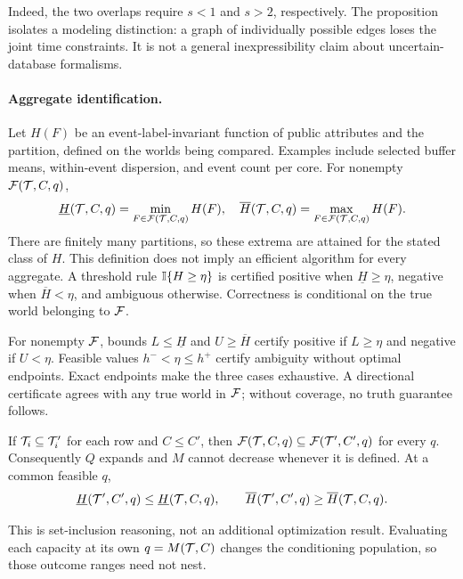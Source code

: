 Indeed, the two overlaps require $s<1$ and $s>2$, respectively.
The proposition isolates a modeling distinction: a graph of individually
possible edges loses the joint time constraints. It is not a general
inexpressibility claim about uncertain-database formalisms.

\paragraph{Aggregate identification.}
Let $H(F)$ be an event-label-invariant function of public attributes and the
partition, defined on the worlds being compared. Examples include selected
buffer means, within-event dispersion, and event count per core.
For nonempty $\mathcal F(\mathcal T,C,q)$,
\begin{equation}
 \underline H(\mathcal T,C,q)=\min_{F\in\mathcal F(\mathcal T,C,q)}H(F),\quad
 \overline H(\mathcal T,C,q)=\max_{F\in\mathcal F(\mathcal T,C,q)}H(F).
 \label{eq:endpoints}
\end{equation}
There are finitely many partitions, so these extrema are attained for the
stated class of $H$. This definition does not imply an efficient algorithm
for every aggregate. A threshold rule $\mathbb I\{H\ge\eta\}$ is certified positive
when $\underline H\ge\eta$, negative when $\overline H<\eta$, and ambiguous
otherwise. Correctness is conditional on the true world belonging to $\mathcal F$.

\begin{theorem}
\label{thm:decisioncertification}
For nonempty $\mathcal F$, bounds $L\le\underline H$ and $U\ge\overline H$ certify
positive if $L\ge\eta$ and negative if $U<\eta$. Feasible values
$h^-<\eta\le h^+$ certify ambiguity without optimal endpoints. Exact endpoints
make the three cases exhaustive. A directional certificate agrees with any
true world in $\mathcal F$; without coverage, no truth guarantee follows.
\end{theorem}

\begin{proposition}
\label{prop:nesting}
If $\mathcal T_i\subseteq\mathcal T'_i$ for each row and $C\le C'$, then
$\mathcal F(\mathcal T,C,q)\subseteq\mathcal F(\mathcal T',C',q)$ for every $q$. Consequently $Q$ expands
and $M$ cannot decrease whenever it is defined. At a common feasible $q$,
\[
 \underline H(\mathcal T',C',q)\le\underline H(\mathcal T,C,q),\qquad
 \overline H(\mathcal T',C',q)\ge\overline H(\mathcal T,C,q).
\]
\end{proposition}

This is set-inclusion reasoning, not an additional optimization result.
Evaluating each capacity at its own $q=M(\mathcal T,C)$ changes the conditioning
population, so those outcome ranges need not nest.

